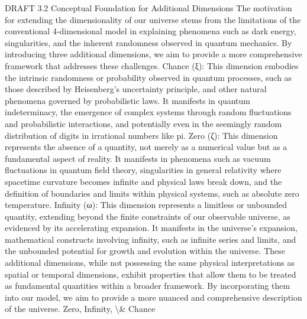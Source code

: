 \documentclass[12pt]{article}
\begin{document}
DRAFT
3.2 Conceptual Foundation for Additional Dimensions
The motivation for extending the dimensionality of our universe stems from the
limitations of the conventional 4-dimensional model in explaining phenomena such as
dark energy, singularities, and the inherent randomness observed in quantum
mechanics. By introducing three additional dimensions, we aim to provide a more
comprehensive framework that addresses these challenges.
Chance (ξ): This dimension embodies the intrinsic randomness or probability observed
in quantum processes, such as those described by Heisenberg's uncertainty principle,
and other natural phenomena governed by probabilistic laws. It manifests in quantum
indeterminacy, the emergence of complex systems through random ﬂuctuations and
probabilistic interactions, and potentially even in the seemingly random distribution of
digits in irrational numbers like pi.
Zero (ζ): This dimension represents the absence of a quantity, not merely as a
numerical value but as a fundamental aspect of reality. It manifests in phenomena such
as vacuum ﬂuctuations in quantum ﬁeld theory, singularities in general relativity where
spacetime curvature becomes inﬁnite and physical laws break down, and the deﬁnition
of boundaries and limits within physical systems, such as absolute zero temperature.
Inﬁnity (ω): This dimension represents a limitless or unbounded quantity, extending
beyond the ﬁnite constraints of our observable universe, as evidenced by its
accelerating expansion. It manifests in the universe's expansion, mathematical
constructs involving inﬁnity, such as inﬁnite series and limits, and the unbounded
potential for growth and evolution within the universe.
These additional dimensions, while not possessing the same physical interpretations as
spatial or temporal dimensions, exhibit properties that allow them to be treated as
fundamental quantities within a broader framework. By incorporating them into our
model, we aim to provide a more nuanced and comprehensive description of the
universe.
Zero, Infinity, \textbackslash{}& Chance
\end{document}
